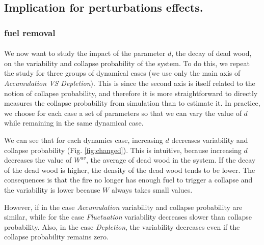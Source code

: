 \documentclass{article}
\begin{document}


\newpage
\subsection{Implication for perturbations effects.}


\subsubsection{fuel removal}
\label{fuel_removal}
\paragraph{}
We now want to study the impact of the parameter $d$, the decay of dead wood, on the variability and collapse probability of the system. To do this, we repeat the study for three groups of dynamical cases (we use only the main axis of \textit{Accumulation VS Depletion}). This is since the second axis is itself related to the notion of collapse probability, and therefore it is more straightforward to directly measures the collapse probability from simulation than to estimate it. In practice, we choose for each case a set of parameters so that we can vary the value of $d$ while remaining in the same dynamical case.

We can see that for each dynamics case, increasing $d$ decreases variability and collapse probability (Fig. \ref{fig:changed}). This is intuitive, because increasing $d$ decreases the value of $W^{av}$, the average of dead wood in the system.  If the decay of the dead wood is higher, the density of the dead wood tends to be lower. The consequences is that the fire no longer has enough fuel to trigger a collapse and the variability is lower because $W$ always takes small values.

However, if in the case \textit{Accumulation} variability and collapse probability are similar, while for the case \textit{Fluctuation} variability decreases slower than collapse probability. Also, in the case \textit{Depletion}, the variability decreases even if the collapse probability remains zero.
\end{document}
